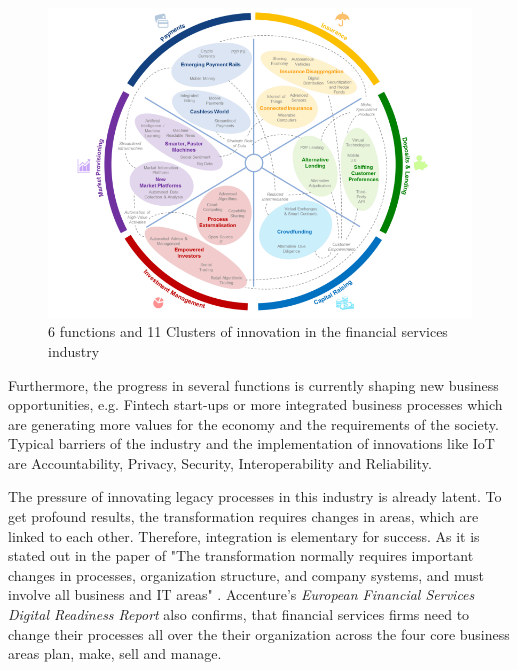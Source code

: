\begin{figure}[H]
\centering
\includegraphics[width=1\columnwidth]{images/industry-financial-services-6segments_wef-copyright.PNG}
\caption{6 functions and 11 Clusters of innovation in the financial services industry}
\end{figure}

Furthermore, the progress in several functions is currently shaping new business opportunities, e.g. Fintech start-ups or more integrated business processes which are generating more values for the economy and the requirements of the society.
Typical barriers of the industry and the implementation of innovations like \ac{IoT} are Accountability, Privacy, Security, Interoperability and Reliability. \cite{WEF-futureFinancialServices, Weber2011133, CapGemini-IoT-financialServices} %

The pressure of innovating legacy processes in this industry is already latent. To get profound results, the transformation requires changes in areas, which are linked to each other. Therefore, integration is elementary for success. As it is stated out in the paper of \citeauthor{ArthurDLittle-FinancialService} "The transformation normally requires important changes in processes, organization structure, and company systems, and must involve all business and IT areas" \cite[p.4 ]{ArthurDLittle-FinancialService}. Accenture's \emph{European Financial Services Digital Readiness Report} also confirms, that financial services firms need to change their processes all over the their organization across the four core business areas plan, make, sell and manage. \cite[p. 9]{accenture-europeanFinancialServices-digitalReadinessReport}

